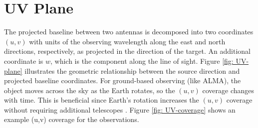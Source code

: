 
\section{UV Plane}



The projected baseline between two antennas is decomposed into two coordinates $ (u, v) $ with units of the observing wavelength along the east and north directions, respectively, as projected in the direction of the target. An additional coordinate is $w$, which is the component along the line of sight. Figure \ref{fig: UV-plane} illustrates the geometric relationship between the source direction and projected baseline coordinates. For ground-based observing (like ALMA), the object moves across the sky as the Earth rotates, so the $(u, v)$ coverage changes with time. This is beneficial since Earth's rotation increases the $(u,v)$ coverage without requiring additional telescopes \citep{Monnier}. Figure \ref{fig: UV-coverage} shows an example (u,v) coverage for the \bfour observations. 









